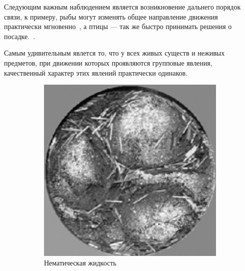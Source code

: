 	Следующим важным наблюдением является возникновение дальнего порядок связи, к примеру, рыбы могут изменять общее направление движения практически мгновенно~\cite{cambui2012}, а птицы --- так же быстро принимать решения о посадке.~\cite{lukeman2010,major1978}.

	Самым удивительным явлется то, что у всех живых существ и неживых предметов, при движении которых проявляются групповые явления, качественный характер этих явлений практически одинаков.

	\begin{figure}
        \centering
        \begin{subfigure}[t]{.4\columnwidth}
        \centering
                \includegraphics[width=\columnwidth]{Images/Fig4_CollectiveMotion.png}
                \caption{Нематическая жидкость~\cite[с. 82]{vicsek2012}}
                \label{fig:CollMot:nematics}
        \end{subfigure}%
        ~ %
        \begin{subfigure}[t]{.4\columnwidth}
        \centering

\end{subfigure}
\end{figure}
